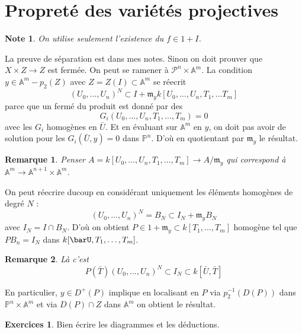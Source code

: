 \documentclass[a4paper,12pt]{book}
\newcommand{\A}{\mathbb{A}}
\newcommand{\m}{\mathfrak{m}}
\renewcommand{\Pr}{\mathbb{P}}
\renewcommand{\P}{\mathscr{P}}
\theoremstyle{plain}
\newtheorem{rem}{Remarque}
\newtheorem{note}{Note}
\theoremstyle{definition}
\newtheorem{exo}[subsection]{Exercices}
\theoremstyle{remark}
\begin{document}
\section{Propreté des variétés projectives}
\begin{note}
    On utilise seulement l'existence du $f\in 1+I$.
\end{note}

La preuve de séparation est dans mes notes. Sinon on doit prouver que
$X\times Z\to Z$ est fermée. On peut se ramener à $\P^n\times \A^m$.
La condition $y\in \A^m-p_2(Z)$ avec $Z=Z(I)\subset \A^m$ se réecrit
\[(U_0,\ldots,U_n)^N\subset I+\m_yk[U_0,\ldots, U_n,T_1,\dots T_m]\]
parce que un fermé du produit est donné par des 
\[G_i(U_0,\ldots, U_n,T_1,\ldots,T_m)=0\]
avec les $G_i$ homogènes en $\bar U$. Et en évaluant sur $\A^m$ en $y$,
on doit pas avoir de solution pour les $G_i(\bar U,y)=0$ dans $\Pr^n$.
D'où en quotientant par $\m_y$ le résultat. 
\begin{rem}
    Penser $A=k[U_0,\ldots, U_n,T_1, \ldots, T_m]\to A/\m_y$ qui 
    correspond à $\A^m\to \A^{n+1}\times \A^m$.
\end{rem}
On peut réecrire ducoup en considérant uniquement les éléments homogènes
de degré $N$ :
\[(U_0,\ldots, U_n)^N=B_N\subset I_N+\m_yB_N\]
avec $I_N=I\cap B_N$. D'où on obtient $P\in 1+\m_y\subset k[T_1,\ldots,
T_m]$ homogène tel que $PB_n=I_N$ dans $k[\barU, T_1,\ldots, T_m]$.
\begin{rem}
    Là c'est 
    \[P(\bar T)(U_0,\ldots, U_n)^N\subset I_N\subset k[\bar U,\bar T]\]
\end{rem}
En particulier, $y\in D^+(P)$ implique en localisant en $P$ via
$p_2^{-1}(D(P))$ dans $\Pr^n\times \A^m$ et via $D(P)\cap Z$ dans 
$\A^m$ on obtient le résultat.
\begin{exo}
     Bien écrire les diagrammes et les déductions.
\end{exo}



\printbibliography
\end{document}
